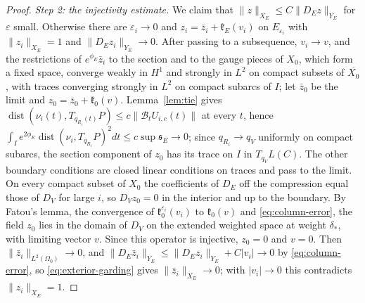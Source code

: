 \documentclass[11pt]{amsart}
\theoremstyle{definition}
\theoremstyle{remark}
\theoremstyle{plain}
\numberwithin{equation}{section}
\newcommand{\eps}{\varepsilon}
\newcommand{\dist}{\operatorname{dist}}
\begin{document}
\begin{proof}
\emph{Step 2: the injectivity estimate.} We claim that
$\|z\|_{X_E}\le C\|D_Ez\|_{Y_E}$ for $\eps$ small. Otherwise there are $\eps_i\to0$
and $z_i=\bar z_i+\mathfrak k_{E}(v_i)$ on $E_{\eps_i}$ with $\|z_i\|_{X_E}=1$ and
$\|D_Ez_i\|_{Y_E}\to0$. After passing to a subsequence, $v_i\to v$, and the
restrictions of $e^{\phi_E}\bar z_i$ to the section and to the gauge pieces of $X_0$,
which form a fixed space, converge weakly in $H^1$ and strongly in $L^2$ on compact
subsets of $\overline{X_0}$, with traces converging strongly in $L^2$ on compact
subarcs of $I$; let $\bar z_0$ be the limit and $z_0=\bar z_0+\mathfrak k_0(v)$.
Lemma~\ref{lem:tie} gives $\dist(\nu_i(t),T_{q_{R_i}(t)}P)\le c\|\mathcal
B_tU_{i,c}(t)\|$ at every $t$, hence
$\int_Ie^{2\phi_E}\dist(\nu_i,T_{q_{R_i}}P)^2dt\le c\sup{\mathfrak s}_E\to0$; since
$q_{R_i}\to q_V$ uniformly on compact subarcs, the section component of $z_0$ has
its trace on $I$ in $T_{q_V}L(C)$. The other boundary conditions are closed linear
conditions on traces and pass to the limit. On every compact subset of $X_0$ the
coefficients of $D_E$ off the compression equal those of $D_V$ for large $i$, so
$D_Vz_0=0$ in the interior and up to the boundary. By Fatou's lemma, the
convergence of $\mathfrak k^{\eps_i}_0(v_i)$ to $\mathfrak k_0(v)$ and
\eqref{eq:column-error}, the field $z_0$ lies in the domain of $D_V$ on the extended weighted space at weight $\delta_*$, with limiting vector $v$. Since this operator is injective,
$z_0=0$ and $v=0$. Then $\|\bar z_i\|_{L^2(\Omega_0)}\to0$, and
$\|D_E\bar z_i\|_{Y_E}\le\|D_Ez_i\|_{Y_E}+C|v_i|\to0$ by \eqref{eq:column-error}, so
\eqref{eq:exterior-garding} gives $\|\bar z_i\|_{X_E}\to0$; with $|v_i|\to0$ this
contradicts $\|z_i\|_{X_E}=1$.


\end{proof}
\end{document}
